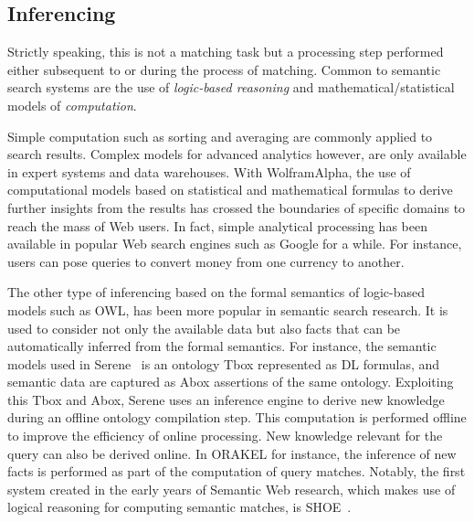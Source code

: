%

	\subsection{Inferencing} Strictly speaking, this is not a matching task but a processing step performed either subsequent to or during the process of matching. Common to semantic search systems are the use of \emph{logic-based reasoning} and mathematical/statistical models of \emph{computation}. 
	
	Simple computation such as sorting and averaging are commonly applied to search results. Complex models for advanced analytics however, are only available in expert systems and data warehouses. With WolframAlpha, the use of computational models based on statistical and mathematical formulas to derive further insights from the results has crossed the boundaries of specific domains to reach the mass of Web users. In fact, simple analytical processing has been available in popular Web search engines such as Google for a while. For instance, users can pose queries to convert money from one currency to another. 
	
	The other type of inferencing based on the formal semantics of logic-based models such as OWL, has been more popular in semantic search research. 
It is used 
to consider not only the available data but also facts that can be automatically inferred from the formal semantics. For instance, the semantic models used in Serene~\cite{DBLP:journals/ws/FazzingaGGL11} is an ontology Tbox represented as DL formulas, and semantic data are captured as Abox assertions of the same ontology. Exploiting this Tbox and Abox, Serene uses an inference engine to derive new knowledge during an offline ontology compilation step. This computation is performed offline to improve the efficiency of online processing. 
New knowledge relevant for the query can also be derived online. 
In ORAKEL for instance, the inference of new facts is performed as part of the computation of query matches. Notably, the first system created in the early years of Semantic Web research, which makes use of logical reasoning for computing semantic matches, is SHOE~\cite{DBLP:conf/dagstuhl/HeflinHL03}. 
	
